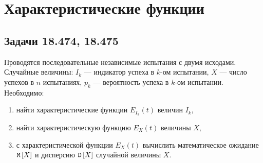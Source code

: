 \chapter{Характеристические функции}

\begin{comment}
    \section*{Задача 18.472}

    Случайная величина $X$ дискретного типа может принимать только два возможных значения -1 и 1, с равными вероятностями. Вычислить характеристическую функцию данного распределения.

    \subsection*{Решение:}

    По определению характеристическая функция $E_X(t)$ случайной величины $X$ имеет вид:
    \begin{multline}
        E_X(t)
        = e^{it \cdot (-1)} \probability{X = -1} + e^{it \cdot 1} \probability{X = 1}
        = e^{-it} \frac{1}{2} + e^{it} \frac{1}{2}
        = \frac{e^{-it} + e^{it}}{2} = \\
        = \frac{\cos t - i \sin t + \cos t + i \sin t}{2}
        = \frac{\cos t + \cos t}{2}
        = \cos t.
    \end{multline}

    \subsection*{Ответ:}
    $\cos t$.
\end{comment}

\section*{Задачи 18.474, 18.475}

Проводятся последовательные независимые испытания с двумя исходами. Случайные величины: $I_k$ --- индикатор успеха в $k$-ом испытании, $X$ --- число успехов в $n$ испытаниях,
$p_k$ --- вероятность успеха в $k$-ом испытании. Необходимо:
\begin{enumerate}
    \item найти характеристические функции $E_{I_k}(t)$ величин $I_k$,
    \item найти характеристическую функцию $E_X(t)$ величины $X$,
    \item с характеристической функции $E_X(t)$ вычислить математическое ожидание $\mathtt{M} \left [ X \right ]$ и дисперсию $\mathtt{D} \left [ X \right ]$ случайной величины $X$.
\end{enumerate}

